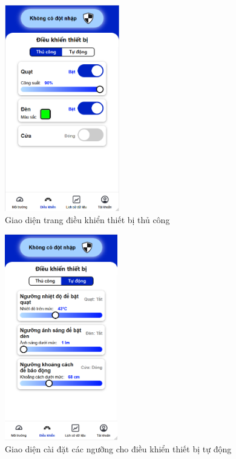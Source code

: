 \begin{minipage}{0.45\textwidth}
    \begin{figure}[H]
        \centering
        \includegraphics[height=9cm]{figures/thucong.png}
        \caption{Giao diện trang điều khiển thiết bị thủ công}
        \label{fig:thucong}
    \end{figure}
\end{minipage}
\hfill
\begin{minipage}{0.45\textwidth}
    \begin{center}
        \begin{figure}[H]
            \centering
            \includegraphics[height=9cm]{figures/tudong.png}
            \caption{Giao diện cài đặt các ngưỡng cho điều khiển thiết bị tự động}
            \label{fig:tudong}
        \end{figure}
    \end{center}
\end{minipage}

